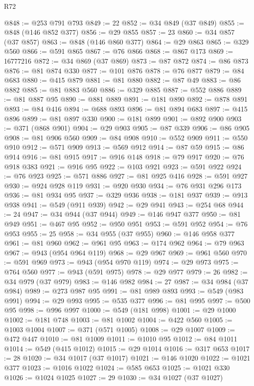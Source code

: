 \begin{lexlean}{R72}
\begin{coremodule}
@848 := @253 @791 @793
@849 := 22
@852 := @34 @849 (@37 @849)
@855 := @848 (@146 @852 @377)
@856 := @29 @855
@857 := 23
@860 := @34 @857 (@37 @857)
@863 := @848 (@146 @860 @377)
@864 := @29 @863
@865 := @329 @560
@866 := @591 @865
@867 := @76 @866
@868 := @867 @173
@869 := 16777216
@872 := @34 @869 (@37 @869)
@873 := @87 @872
@874 := @86 @873
@876 := @81 @874 @330
@877 := @101 @876
@878 := @76 @877
@879 := @84 @683
@880 := @415 @879
@881 := @81 @880
@882 := @87 @49
@883 := @86 @882
@885 := @81 @883 @560
@886 := @329 @885
@887 := @552 @886
@889 := @81 @887 @95
@890 := @881 @889
@891 := @181 @890
@892 := @878 @891
@893 := @84 @416
@894 := @688 @893
@896 := @81 @894 @683
@897 := @415 @896
@899 := @81 @897 @330
@900 := @181 @899
@901 := @892 @900
@903 := @371 (@868 @901)
@904 := @29 @903
@905 := @87 @339
@906 := @86 @905
@908 := @81 @906 @560
@909 := @84 @908
@910 := @552 @909
@911 := @550 @910
@912 := @571 @909
@913 := @569 @912
@914 := @87 @59
@915 := @86 @914
@916 := @81 @915
@917 := @916 @148
@918 := @79 @917
@920 := @76 @918 @383
@921 := @916 @95
@922 := @103 @921
@923 := @591 @922
@924 := @76 @923
@925 := @571 @886
@927 := @81 @925 @416
@928 := @591 @927
@930 := @924 @928 @119
@931 := @920 @930
@934 := @76 @931 @296 @173
@936 := @81 @934 @95
@937 := @329 @936
@938 := @181 @937
@939 := @913 @938
@941 := @549 (@911 @939)
@942 := @29 @941
@943 := @254 @68
@944 := 24
@947 := @34 @944 (@37 @944)
@949 := @146 @947 @377
@950 := @81 @949
@951 := @467 @95
@952 := @950 @951
@953 := @591 @952
@954 := @76 @953
@955 := 25
@958 := @34 @955 (@37 @955)
@960 := @146 @958 @377
@961 := @81 @960
@962 := @961 @95
@963 := @174 @962
@964 := @79 @963
@967 := @943 (@954 @964 @119)
@968 := @29 @967
@969 := @961 @560
@970 := @591 @969
@973 := @943 (@954 @970 @119)
@974 := @29 @973
@975 := @764 @560
@977 := @943 (@591 @975)
@978 := @29 @977
@979 := 26
@982 := @34 @979 (@37 @979)
@983 := @146 @982
@984 := 27
@987 := @34 @984 (@37 @984)
@989 := @273 @987 @95
@991 := @81 @989 @893
@993 := @549 (@983 @991)
@994 := @29 @993
@995 := @535 @377
@996 := @81 @995
@997 := @500 @95
@998 := @996 @997
@1000 := @549 (@181 @998)
@1001 := @29 @1000
@1002 := @181 @748
@1003 := @81 @1002
@1004 := @422 @560
@1005 := @1003 @1004
@1007 := @371 (@571 @1005)
@1008 := @29 @1007
@1009 := @472 @447
@1010 := @81 @1009
@1011 := @1010 @95
@1012 := @84 @1011
@1014 := @549 (@415 @1012)
@1015 := @29 @1014
@1016 := @317 @653
@1017 := 28
@1020 := @34 @1017 (@37 @1017)
@1021 := @146 @1020
@1022 := @1021 @377
@1023 := @1016 @1022
@1024 := @585 @653
@1025 := @1021 @330
@1026 := @1024 @1025
@1027 := 29
@1030 := @34 @1027 (@37 @1027)

\end{coremodule}
\end{lexlean}
